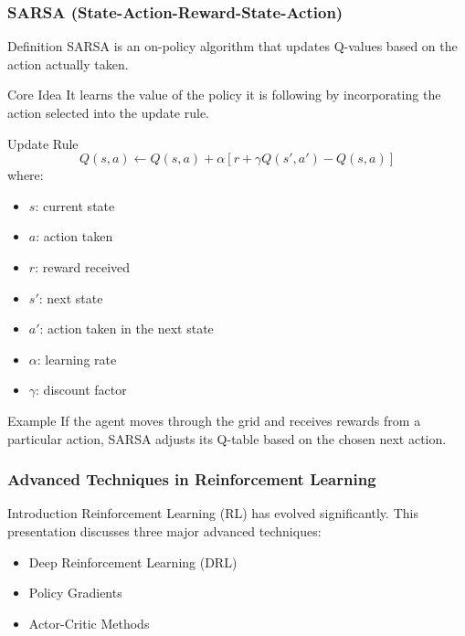 \documentclass[aspectratio=169]{beamer}
\begin{document}
\begin{frame}[fragile]
    \frametitle{SARSA (State-Action-Reward-State-Action)}
    \begin{block}{Definition}
        SARSA is an on-policy algorithm that updates Q-values based on the action actually taken.
    \end{block}
    
    \begin{block}{Core Idea}
        It learns the value of the policy it is following by incorporating the action selected into the update rule.
    \end{block}
    
    \begin{block}{Update Rule}
        \begin{equation}
            Q(s, a) \leftarrow Q(s, a) + \alpha \left[r + \gamma Q(s', a') - Q(s, a)\right]
        \end{equation}
        where: 
        \begin{itemize}
            \item \(s\): current state
            \item \(a\): action taken
            \item \(r\): reward received
            \item \(s'\): next state
            \item \(a'\): action taken in the next state
            \item \(\alpha\): learning rate
            \item \(\gamma\): discount factor
        \end{itemize}
    \end{block}
    
    \begin{block}{Example}
        If the agent moves through the grid and receives rewards from a particular action, SARSA adjusts its Q-table based on the chosen next action.
    \end{block}
\end{frame}

\begin{frame}[fragile]
    \frametitle{Advanced Techniques in Reinforcement Learning}
    \begin{block}{Introduction}
        Reinforcement Learning (RL) has evolved significantly. This presentation discusses three major advanced techniques:
        \begin{itemize}
            \item Deep Reinforcement Learning (DRL)
            \item Policy Gradients
            \item Actor-Critic Methods
        \end{itemize}
    \end{block}
\end{frame}
\end{document}
